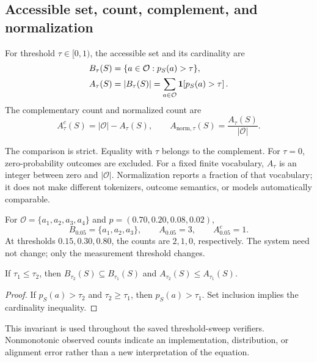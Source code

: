 \subsection{Accessible set, count, complement, and normalization}
\begin{definition}
For threshold $\tau\in[0,1)$, the accessible set and its cardinality are
\begin{align}
B_\tau(S)&=\{a\in\mathcal O:p_S(a)>\tau\},\label{eq:accessible-set}\\
A_\tau(S)&=|B_\tau(S)|
=\sum_{a\in\mathcal O}\mathbf 1\!\left[p_S(a)>\tau\right].
\label{eq:accessible-volume}
\end{align}
The complementary count and normalized count are
\begin{equation}
A^c_\tau(S)=|\mathcal O|-A_\tau(S),\qquad
A_{\mathrm{norm},\tau}(S)=\frac{A_\tau(S)}{|\mathcal O|}.
\label{eq:complement-normalized}
\end{equation}
\end{definition}

The comparison is strict. Equality with $\tau$ belongs to the complement. For $\tau=0$, zero-probability outcomes are excluded. For a fixed finite vocabulary, $A_\tau$ is an integer between zero and $|\mathcal O|$. Normalization reports a fraction of that vocabulary; it does not make different tokenizers, outcome semantics, or models automatically comparable.

\begin{example}
For $\mathcal O=\{a_1,a_2,a_3,a_4\}$ and
$p=(0.70,0.20,0.08,0.02)$,
\begin{equation}
B_{0.05}=\{a_1,a_2,a_3\},\qquad A_{0.05}=3,\qquad A^c_{0.05}=1.
\end{equation}
At thresholds $0.15,0.30,0.80$, the counts are $2,1,0$, respectively. The system need not change; only the measurement threshold changes.
\end{example}

\begin{proposition}
If $\tau_1\leq\tau_2$, then $B_{\tau_2}(S)\subseteq B_{\tau_1}(S)$ and
$A_{\tau_2}(S)\leq A_{\tau_1}(S)$.
\end{proposition}
\begin{proof}
If $p_S(a)>\tau_2$ and $\tau_2\geq\tau_1$, then $p_S(a)>\tau_1$. Set inclusion implies the cardinality inequality.
\end{proof}
This invariant is used throughout the saved threshold-sweep verifiers. Nonmonotonic observed counts indicate an implementation, distribution, or alignment error rather than a new interpretation of the equation.

